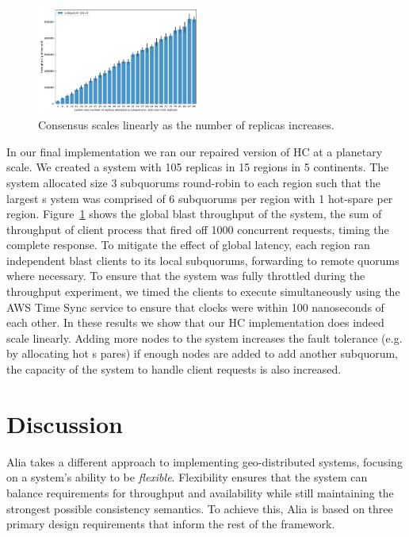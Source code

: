 \documentclass[11pt,conference]{IEEEtran}
\begin{document}
\begin{figure}
    \centering
    \includegraphics[width=0.48\textwidth]{figures/geoconsensus_throughput}
    \caption{Consensus scales linearly as the number of replicas increases.}
    \label{fig:geoconsensus_throughput}
\end{figure}

In our final implementation we ran our repaired version of HC at a planetary scale.
We created a system with 105 replicas in 15 regions in 5 continents.
The system allocated size 3 subquorums round-robin to each region such that the largest s
ystem was comprised of 6 subquorums per region with 1 hot-spare per region.
Figure~\ref{fig:geoconsensus_throughput} shows the global blast throughput of 
the system, the sum of throughput of client process that fired off 1000 concurrent 
requests, timing the complete response.
To mitigate the effect of global latency, each region ran independent blast clients to 
its local subquorums, forwarding to remote quorums where necessary.
To ensure that the system was fully throttled during the throughput experiment, we timed 
the clients to execute simultaneously using the AWS Time Sync service to ensure that 
clocks were within 100 nanoseconds of each other.
In these results we show that our HC implementation does indeed scale linearly.
Adding more nodes to the system increases the fault tolerance (e.g. by allocating hot s
pares) if enough nodes are added to add another subquorum, the capacity of the system to 
handle client requests is also increased.

\section{Discussion}

Alia takes a different approach to implementing geo-distributed systems, focusing
on a system's ability to be \emph{flexible}.
Flexibility ensures that the system can balance requirements for throughput and
availability while still maintaining the strongest possible consistency semantics.
To achieve this, Alia is based on three primary design requirements that inform the
rest of the framework.
\end{document}
